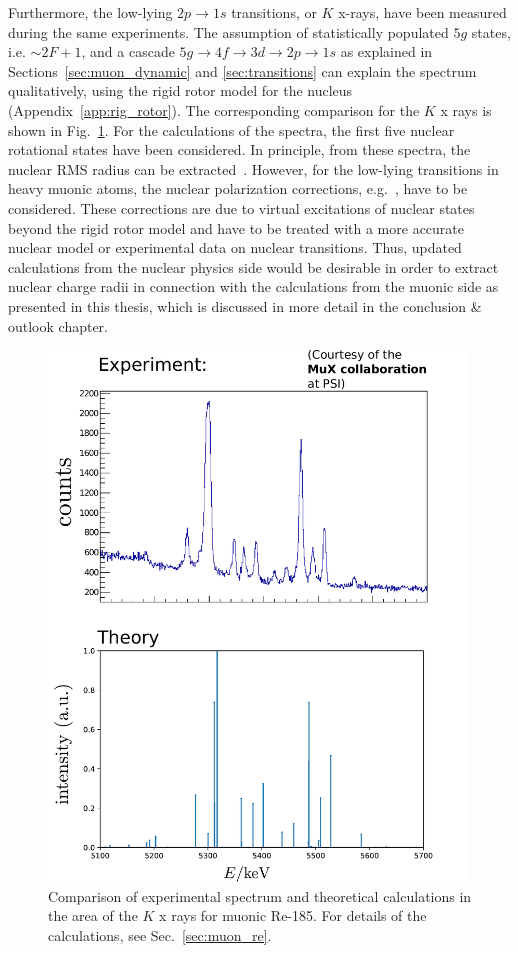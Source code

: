 Furthermore, the low-lying $2p\rightarrow1s$ transitions, or $K$ x-rays, have been measured during the same experiments. The assumption of statistically populated $5g$ states, i.e. $\sim 2F+1$, and a cascade $5g\rightarrow 4f \rightarrow 3d \rightarrow 2p \rightarrow 1s$ as explained in Sections~\ref{sec:muon_dynamic} and \ref{sec:transitions} can explain the spectrum qualitatively, using the rigid rotor model for the nucleus (Appendix~\ref{app:rig_rotor}). The corresponding comparison for the $K$ x rays is shown in Fig.~\ref{fig:re54_K}. For the calculations of the spectra, the first five nuclear rotational states have been considered. In principle, from these spectra, the nuclear RMS radius can be extracted~\cite{hitlin1970}. However, for the low-lying transitions in heavy muonic atoms, the nuclear polarization corrections, e.g.~\cite{chen1970}, have to be considered. These corrections are due to virtual excitations of nuclear states beyond the rigid rotor model and have to be treated with a more accurate nuclear model or experimental data on nuclear transitions. Thus, updated calculations from the nuclear physics side would be desirable in order to extract nuclear charge radii in connection with the calculations from the muonic side as presented in this thesis, which is discussed in more detail in the conclusion \& outlook chapter.
\begin{figure}%
\centering
\includegraphics[width=0.99\textwidth]{pics/185Re_K}
\caption{
Comparison of experimental spectrum and theoretical calculations in the area of the $K$ x rays for muonic Re-185. For details of the calculations, see Sec.~\ref{sec:muon_re}.
}
\label{fig:re54_K}
\end{figure}
